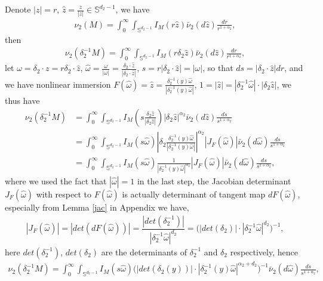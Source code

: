 \documentclass[11pt,reqno]{amsart}
\numberwithin{equation}{section}
\newcommand{\s}{\mathbb{S}}
\newcommand{\al}{\alpha}
\newcommand{\om}{\omega}
\newcommand{\de}{\delta}
\begin{document}
Denote $|z|=r$, $\hat{z}=\frac{z}{|z|}\in\s^{d_{2}-1}$, we have
\begin{align*}
	\nu_{2}(M)=\int_{0}^{\infty}\int_{\s^{d_{2}-1}}I_{M}(r\hat{z})\bar{\nu}_{2}(d\hat{z})\frac{dr}{r^{1+\al_{2}}},
\end{align*}
then
\begin{align*}
	\nu_{2}(\de^{-1}_2M)=\int_{0}^{\infty}\int_{\s^{d_{2}-1}}I_{M}(r\de_2\hat{z})\bar{\nu}_{2}(d\hat{z})\frac{dr}{r^{1+\al_{2}}},
\end{align*}
let $\om=\de_2 \cdot z =r\de_2 \cdot \hat{z}$,  $\hat{\om}=\frac{\om}{|\om|}=\frac{\de_2 \cdot \hat{z}}{|\de_2 \cdot \hat{z}|}$, $s=r|\de_2 \cdot \hat{z}|=|\om|$, so that $ds=|\de_2 \cdot \hat{z}|dr$, and we have nonlinear immersion  $F(\hat{\om})=\hat{z}=\frac{\delta^{-1}_2(y) \hat{\omega}}{|\delta^{-1}_2(y) \hat{\omega}|}$, $1=|\hat{z}|=|\de_2^{-1}\hat{\om}|\cdot|\de_2 \hat{z}|$, we thus have 
\begin{align*}
	\nu_{2}(\de^{-1}_2M)
	&=\int_{0}^{\infty}\int_{\s^{d_{2}-1}}I_{M}\left(s\frac{\de_2\hat{z}}{|\de_2\hat{z}|}\right)|\de_2\hat{z}|^{\al_{2}}\bar{\nu}_{2}(d\hat{z})\frac{ds}{s^{1+\al_{2}}}\\
	&=\int_{0}^{\infty}\int_{\s^{d_{2}-1}}I_{M}(s\hat{\om})\left| \de_2\frac{\delta^{-1}_2(y) \hat{\omega}}{|\delta^{-1}_2(y) \hat{\omega}|}\right| ^{\al_{2}}|J_F(\hat{\om})|\bar{\nu}_{2}(d\hat{\om})\frac{ds}{s^{1+\al_{2}}}\\
	&=\int_{0}^{\infty}\int_{\s^{d_{2}-1}}I_{M}(s\hat{\om})\frac{1}{|\delta^{-1}_2(y) \hat{\omega}|^{\al_{2}}} |J_F(\hat{\om})|\bar{\nu}_{2}(d\hat{\om})\frac{ds}{s^{1+\al_{2}}},
\end{align*}
where we used the fact that $|\hat{\om}|=1$ in the last step, the Jacobian determinant $J_F(\hat{\om})$ with respect to $F(\hat{\om})$ is actually determinant of tangent map $dF(\hat{\om})$, especially from Lemma \ref{jac} in Appendix we have,
\begin{align*}
	|J_F(\hat{\om})|=|det(dF(\hat{\om}))|=\dfrac{|det(\de_2^{-1})|}{|\de_2^{-1}\hat{\om}|^{d_{2}}}=\big(|det(\de_2)|\cdot|\de_2^{-1}\hat{\om}|^{d_{2}} \big)^{-1},
\end{align*}
here $det(\de_2^{-1})$, $det(\de_2)$ are the determinants of $\de_2^{-1}$ and $\de_2$ respectively, hence
\begin{align*}
	\nu_{2}(\de^{-1}_2M)=\int_{0}^{\infty}\int_{\s^{d_{2}-1}}I_{M}(s\hat{\om})\big(|det(\de_2(y))|\cdot|\de_2^{-1}(y)\hat{\om}|^{\al_{2}+d_{2}}\big)^{-1} \bar{\nu}_{2}(d\hat{\om})\frac{ds}{s^{1+\al_{2}}},
\end{align*}
\end{document}
